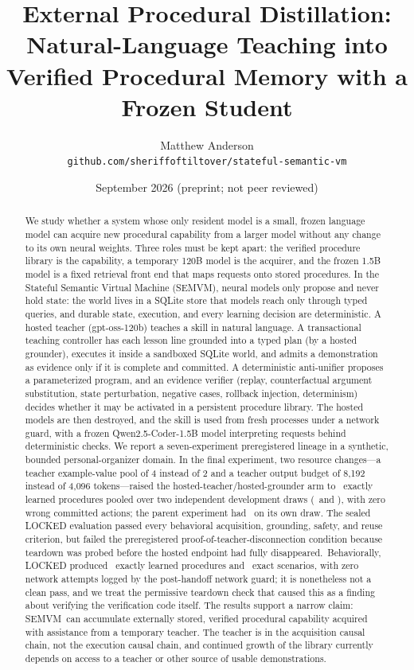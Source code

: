 \documentclass[10pt]{article}
\title{\textbf{External Procedural Distillation:\\ Natural-Language Teaching into Verified Procedural Memory with a Frozen Student}}
\author{Matthew Anderson\\ \small\texttt{github.com/sheriffoftiltover/stateful-semantic-vm}}
\date{September 2026 \quad (preprint; not peer reviewed)}
\newcommand{\semvm}{SEMVM}
\newcommand{\lockedsentence}{The sealed LOCKED evaluation passed every behavioral acquisition, grounding, safety, and reuse criterion, but failed the preregistered proof-of-teacher-disconnection condition because teardown was probed before the hosted endpoint had fully disappeared.}
\begin{document}
\maketitle

\begin{abstract}
\noindent
We study whether a system whose only resident model is a small, frozen language model can acquire new procedural capability from a larger model without any change to its own neural weights. Three roles must be kept apart: the verified procedure library is the capability, a temporary 120B model is the acquirer, and the frozen 1.5B model is a fixed retrieval front end that maps requests onto stored procedures. In the Stateful Semantic Virtual Machine (\semvm), neural models only propose and never hold state: the world lives in a SQLite store that models reach only through typed queries, and durable state, execution, and every learning decision are deterministic. A hosted teacher (gpt-oss-120b) teaches a skill in natural language. A transactional teaching controller has each lesson line grounded into a typed plan (by a hosted grounder), executes it inside a sandboxed SQLite world, and admits a demonstration as evidence only if it is complete and committed. A deterministic anti-unifier proposes a parameterized program, and an evidence verifier (replay, counterfactual argument substitution, state perturbation, negative cases, rollback injection, determinism) decides whether it may be activated in a persistent procedure library. The hosted models are then destroyed, and the skill is used from fresh processes under a network guard, with a frozen Qwen2.5-Coder-1.5B model interpreting requests behind deterministic checks.
We report a seven-experiment preregistered lineage in a synthetic, bounded personal-organizer domain. In the final experiment, two resource changes---a teacher example-value pool of 4 instead of 2 and a teacher output budget of 8{,}192 instead of 4{,}096 tokens---raised the hosted-teacher/hosted-grounder arm to \rciDLearnedPooled\ exactly learned procedures pooled over two independent development draws (\rciDLearnedA\ and \rciDLearnedB), with zero wrong committed actions; the parent experiment had \ttpDLearned\ on its own draw.
\lockedsentence\ Behaviorally, LOCKED produced \lockedLearned\ exactly learned procedures and \lockedScenario\ exact scenarios, with zero network attempts logged by the post-handoff network guard; it is nonetheless not a clean pass, and we treat the permissive teardown check that caused this as a finding about verifying the verification code itself. The results support a narrow claim: \semvm\ can accumulate externally stored, verified procedural capability acquired with assistance from a temporary teacher. The teacher is in the acquisition causal chain, not the execution causal chain, and continued growth of the library currently depends on access to a teacher or other source of usable demonstrations.
\end{abstract}
\end{document}

